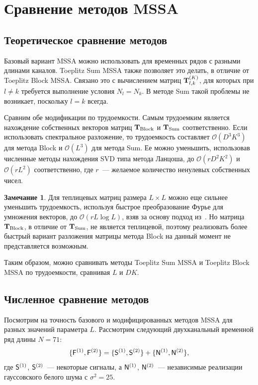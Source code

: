 \documentclass[specialist,
substylefile = spbu.rtx,
               subf,href,colorlinks=true, 12pt]{disser}
\theoremstyle{definition}
\newtheorem{remark}{Замечание}
\begin{document}
\section{Сравнение методов MSSA}\label{sect:mssa_comparison}
\subsection{Теоретическое сравнение методов}
Базовый вариант MSSA можно использовать для временных рядов с разными длинами каналов. Toeplitz Sum MSSA также позволяет это делать, в отличие от Toeplitz Block MSSA. Связано это с вычислением матриц $\mathbf{T}_{l,k}^{(K)}$, для которых при $l\ne k$ требуется выполнение условия $N_l=N_k$. В методе Sum такой проблемы не возникает, поскольку $l=k$ всегда.

Сравним обе модификации по трудоемкости. Самым трудоемким является нахождение собственных векторов матриц $\mathbf{T}_{\text{Block}}$ и $\mathbf{T}_{\text{Sum}}$ соответственно. Если использовать спектральное разложение, то трудоемкость составляет $\mathcal{O}(D^3K^3)$ для метода Block и $\mathcal{O}(L^3)$ для метода Sum. Ее можно уменьшить, использовав численные методы нахождения SVD типа метода Ланцоша, до $\mathcal{O}(rD^2K^2)$ и $\mathcal{O}(rL^2)$ соответственно, где $r$~--- желаемое количество ненулевых собственных чисел.
\begin{remark}\label{remark:mssa_complexity}
	Для теплицевых матриц размера $L\times L$ можно еще сильнее уменьшить трудоемкость, используя быстрое преобразование Фурье для умножения векторов, до $\mathcal{O}(r L\log L)$, взяв за основу подход из~\cite{Korobeynikov2010,Golyandina2015}. Но матрица $\mathbf{T}_{\text{Block}}$, в отличие от $\mathbf{T}_{\text{Sum}}$, не является теплицевой, поэтому реализовать более быстрый вариант разложения матрицы метода Block на данный момент не представляется возможным.
\end{remark}
Таким образом, можно сравнивать методы Toeplitz Sum MSSA и Toeplitz Block MSSA по трудоемкости, сравнивая $L$ и $DK$.

\subsection{Численное сравнение методов}
Посмотрим на точность базового и модифицированных методов MSSA для разных значений параметра $L$. Рассмотрим следующий двухканальный временной ряд длины ${N=71}$:
$$\{\mathsf{F}^{(1)}, \mathsf{F}^{(2)}\}=\{\mathsf{S}^{(1)},\mathsf{S}^{(2)}\} + \{\mathsf{N}^{(1)},\mathsf{N}^{(2)}\},$$
где $\mathsf{S}^{(1)}$, $\mathsf{S}^{(2)}$~--- некоторые сигналы, а $\mathsf{N}^{(1)}$, $\mathsf{N}^{(2)}$~--- независимые реализации гауссовского белого шума с $\sigma^2=25$.
\end{document}
